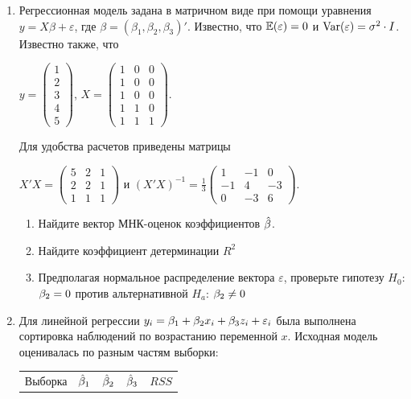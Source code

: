 \documentclass[12pt, a4paper]{article}\usepackage[]{graphicx}\usepackage[]{color}
\begin{document}
\begin{enumerate}
\item Регрессионная модель  задана в матричном виде при помощи уравнения $y=X\beta+\varepsilon$, где $\beta=(\beta_1,\beta_2,\beta_3)'$.
Известно, что $\mathbb{E}(\varepsilon)=0$  и  $\operatorname{Var}(\varepsilon)=\sigma^2\cdot I$.
Известно также, что

$y=\left(
\begin{array}{c}
1\\
2\\
3\\
4\\
5
\end{array}\right)$,
$X=\left(\begin{array}{ccc}
1 & 0 & 0 \\
1 & 0 & 0 \\
1 & 0 & 0 \\
1 & 1 & 0 \\
1 & 1 & 1
\end{array}\right)$.


Для удобства расчетов приведены матрицы


$X'X=\left(
\begin{array}{ccc}
5 & 2 & 1\\
2 & 2 & 1\\
1 & 1 & 1
\end{array}\right)$ и $(X'X)^{-1}=\frac{1}{3}\left(
\begin{array}{ccc}
1 & -1 & 0 \\
-1 & 4 & -3 \\
0 & -3 & 6
\end{array}\right)$.

\begin{enumerate}
\item Найдите вектор МНК-оценок коэффициентов $\hat{\beta}$.
\item Найдите коэффициент детерминации $R^2$
\item Предполагая нормальное распределение вектора $\varepsilon$, проверьте гипотезу $H_0$: $\beta_2=0$ против альтернативной $H_a$: $\beta_2\neq 0$
\end{enumerate}

\item Для линейной регрессии $y_i = \beta_1 + \beta_2 x_i + \beta_3 z_i + \varepsilon_i$ была выполнена сортировка наблюдений по возрастанию переменной $x$. Исходная модель оценивалась по разным частям выборки:

\begin{tabular}{c|cccc}
Выборка & $\hat{\beta}_1$ & $\hat{\beta}_2$ & $\hat{\beta}_3$ & $RSS$ \\


\end{tabular}
\end{enumerate}
\end{document}
